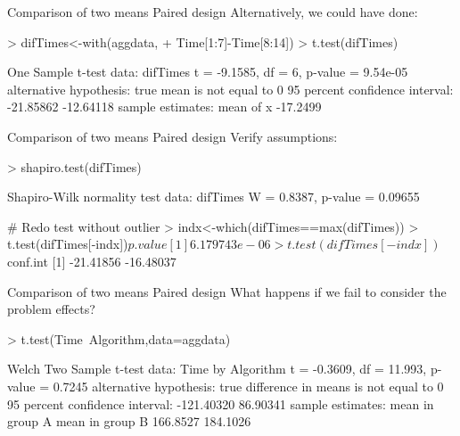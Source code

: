 \documentclass[t]{beamer}
\begin{document}

\begin{ftstf}
{Comparison of two means}
{Paired design}
Alternatively, we could have done:
\begin{rcode}
> difTimes<-with(aggdata,
+             Time[1:7]-Time[8:14])
> t.test(difTimes)


One Sample t-test
data:  difTimes
t = -9.1585, df = 6, p-value = 9.54e-05
alternative hypothesis: true mean is not equal to 0
95 percent confidence interval:
 -21.85862 -12.64118
sample estimates:
mean of x 
 -17.2499 
\end{rcode}
\end{ftstf}


\begin{ftstf}
{Comparison of two means}
{Paired design}
Verify assumptions:
\begin{rcode}
> shapiro.test(difTimes)

Shapiro-Wilk normality test
data:  difTimes
W = 0.8387, p-value = 0.09655

# Redo test without outlier
> indx<-which(difTimes==max(difTimes))
> t.test(difTimes[-indx])$p.value
[1] 6.179743e-06
> t.test(difTimes[-indx])$conf.int
[1] -21.41856 -16.48037
\end{rcode}
\end{ftstf}


\begin{ftstf}
{Comparison of two means}
{Paired design}
What happens if we fail to consider the problem effects?
\begin{rcode}
> t.test(Time~Algorithm,data=aggdata)

Welch Two Sample t-test
data:  Time by Algorithm
t = -0.3609, df = 11.993, p-value = 0.7245
alternative hypothesis: true difference in means is not equal to 0
95 percent confidence interval:
 -121.40320   86.90341
sample estimates:
mean in group A mean in group B 
       166.8527        184.1026 
\end{rcode}
\end{ftstf}

\end{document}
